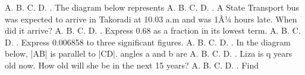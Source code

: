 \documentclass{article}
\begin{document}
\begin{multicols}{2}
\newline \indent A. \newline \indent B. \newline \indent C. \newline \indent D.  \newline{}. The diagram below represents \newline \indent A. \newline \indent B. \newline \indent C. \newline \indent D.  \newline{}. A State Transport bus was expected to arrive in Takoradi at 10.03 a.m and was 1Â¼ hours late. When did it arrive? \newline \indent A. \newline \indent B. \newline \indent C. \newline \indent D.  \newline{}. Express 0.68 as a fraction in its lowest term. \newline \indent A. \newline \indent B. \newline \indent C. \newline \indent D.  \newline{}. Express 0.006858 to three significant figures. \newline \indent A. \newline \indent B. \newline \indent C. \newline \indent D.  \newline{}. In the diagram below, |AB| is parallel to |CD|. angles a and b are \newline \indent A. \newline \indent B. \newline \indent C. \newline \indent D.  \newline{}. Liza is q years old now. How old will she be in the next 15 years? \newline \indent A. \newline \indent B. \newline \indent C. \newline \indent D.  \newline{}. Find 
\end{multicols}
\end{document}
